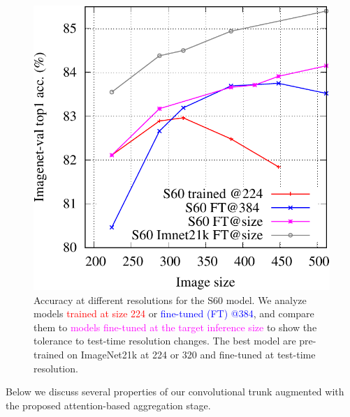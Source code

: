 \begin{figure}[h!]
\begin{minipage}{0.32\linewidth}
\caption{Peak memory for varying resolution and different models. Some models like Swin require a full training at the target resolution. Our model scales linearly as a function of the image surface, like other ConvNets. This is in contrast to most attention-based models, which abide by a quadratic complexity for images large enough. 
%
\label{fig:mem_vs_resolution_S60}} 
\end{minipage}
\hfill 
\begin{minipage}{0.32\linewidth}
\includegraphics[width=\linewidth]{figs/acc_vs_resolution_S60}
\caption{Accuracy at different resolutions for the S60 model. We analyze models \textcolor{red}{trained at size 224} or \textcolor{blue}{fine-tuned (FT) @384}, and compare them to \textcolor{magenta}{models fine-tuned at the target inference size} to show the tolerance to test-time resolution changes. 
The \textcolor{black!70}{best model are pre-trained on ImageNet21k} at 224 or 320 and fine-tuned at test-time resolution. 
\label{fig:acc_vs_resolution_S60}} 
\end{minipage}
\vspace{-1.5ex}
\end{figure}


Below we discuss several properties of our convolutional trunk augmented with the proposed attention-based aggregation stage. 


